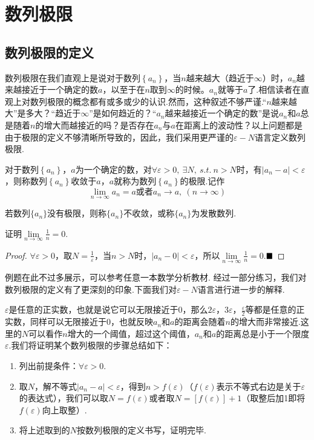 \chapter{数列极限}
\section{数列极限的定义}
数列极限在我们直观上是说对于数列$\left\{a_n\right\}$，当$n$越来越大（趋近于$\infty$）时，$a_n$越来越接近于一个确定的数$a$，以至于在$n$取到$\infty$的时候。$a_n$就等于$a$了.相信读者在直观上对数列极限的概念都有或多或少的认识.然而，这种叙述不够严谨.“$n$越来越大”是多大？“趋近于$\infty$”是如何趋近的？“$a_n$越来越接近一个确定的数”是说$a_n$和$a$总是随着$n$的增大而越接近的吗？是否存在$a_n$与$a$在距离上的波动性？以上问题都是由于极限的定义不够清晰所导致的，因此，我们采用更严谨的$\varepsilon-N$语言定义数列极限.
\begin{definition}[数列极限]
	对于数列$\left\{a_n\right\}$，$a$为一个确定的数，对$\forall \varepsilon>0,\ \exists N,\ s.t.\ n>N$时，有$\lvert a_n-a\rvert<\varepsilon$，则称数列$\left\{a_n\right\}$收敛于$a$，$a$就称为数列$\left\{a_n\right\}$的极限.记作$$\lim\limits_{n\to\infty}a_n=a\mbox{或者}a_n\to a,\ (n\to \infty)$$
\end{definition}
若数列$\{a_n\}$没有极限，则称$\{a_n\}$不收敛，或称$\{a_n\}$为{\heiti 发散数列}.
\begin{example}
	证明$\lim\limits_{n\to\infty}\frac{1}{n}=0$.
\end{example}
\begin{proof}
	$\forall \varepsilon>0$，取$N=\frac{1}{\varepsilon}$，当$n>N$时，$\lvert a_n-0\rvert<\varepsilon$，所以$\lim\limits_{n\to\infty}\frac{1}{n}=0$.$\hfill\blacksquare$
\end{proof}
例题在此不过多展示，可以参考任意一本数学分析教材.
经过一部分练习，我们对数列极限的定义有了更深刻的印象.下面我们对$\varepsilon-N$语言进行进一步的解释.

$\varepsilon$是任意的正实数，也就是说它可以无限接近于$0$，那么$2\varepsilon$，$3\varepsilon$，$\frac{\varepsilon}{2}$等都是任意的正实数，同样可以无限接近于$0$，也就反映$a_n$和$a$的距离会随着$n$的增大而非常接近.这里的$N$可以看作$n$增大的一个阈值，超过这个阈值，$a_n$和$a$的距离总是小于一个限度$\varepsilon$.我们将证明某个数列极限的步骤总结如下：
\begin{enumerate}
	\item 列出前提条件：$\forall \varepsilon>0$.
	\item 取$N$，解不等式$\lvert a_n-a \rvert<\varepsilon$，得到$n>f(\varepsilon)$（$f(\varepsilon)$表示不等式右边是关于$\varepsilon$的表达式），我们可以取$N=f(\varepsilon)$或者取$N=\left[f(\varepsilon)\right]+1$（取整后加1即将$f(\varepsilon)$向上取整）.
	\item 将上述取到的$N$按数列极限的定义书写，证明完毕.
\end{enumerate}

